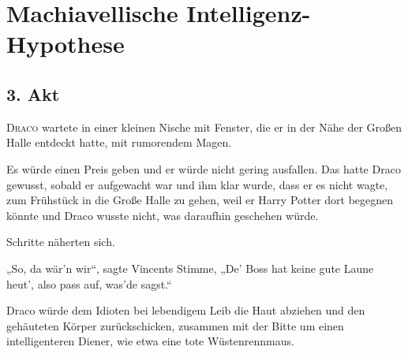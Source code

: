 \chapter{Machiavellische Intelligenz-Hypothese}


\section{3. Akt}

\lettrine{D}{raco} wartete in einer kleinen Nische mit Fenster, die er in der Nähe der Großen Halle entdeckt hatte, mit rumorendem Magen.

Es würde einen Preis geben und er würde nicht gering ausfallen. Das hatte Draco gewusst, sobald er aufgewacht war und ihm klar wurde, dass er es nicht wagte, zum Frühstück in die Große Halle zu gehen, weil er Harry Potter dort begegnen könnte und Draco wusste nicht, was daraufhin geschehen würde.

Schritte näherten sich.

„So, da wär’n wir“, sagte Vincents Stimme,
„De’ Boss hat keine gute Laune heut’, also pass auf, was’de sagst.“

Draco würde dem Idioten bei lebendigem Leib die Haut abziehen und den gehäuteten Körper zurückschicken, zusammen mit der Bitte um einen intelligenteren Diener, wie etwa eine tote Wüstenrennmaus.

